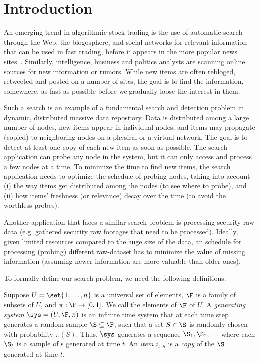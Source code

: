 \section{Introduction}\label{sec:introduction}
An emerging trend in algorithmic stock trading is the use of automatic search through the Web, the blogosphere, and social networks for relevant information that can be used in fast trading, before it appears in the more popular news sites~\cite{Delaney2009,ALPHA2014,AlphaFlash,mitra2011handbook,latar2015robot}. Similarly, intelligence, business and politics analysts are scanning online sources for new information or rumors. While new items are often rebloged, retweeted and posted on a number of sites, the goal is to find the information, somewhere, as fast as possible before we gradually loose the interest in them. %

Such a search is an example of a fundamental search and detection problem in dynamic, distributed massive data repository.  Data is distributed among a large number of nodes, new items appear in individual nodes, and items may propagate (copied) to neighboring nodes on a physical or a virtual network.  The goal is to detect at least one copy of each new item as soon as possible. The search application can probe any node in the system, but it can only access and process a few nodes at a time. 
To minimize the time to find new items, the search application needs to optimize the schedule of probing nodes, taking into account (i) the way items get distributed among the nodes (to see where to probe), and (ii) how items' freshness (or relevance) decay over the time (to avoid the worthless probes).


Another application that faces a similar search problem is processing security raw data (e.g. gathered security raw footages that need to be processed). Ideally, given limited resources compared to the huge size of the data, an schedule for processing (probing) different raw-dataset has to minimize the value of missing information (assuming newer information are more valuable than older ones).

To formally define our search problem, {\probname} we need the following definitions.

\begin{definition}
 Suppose $U=\set{1,\ldots,n}$ is a universal set of elements, $\F$ is a family of subsets of $U$, and $\pi:\F \rightarrow [0,1]$. We call the elements of $\F$ \emph{\ins} of $U$. A \emph{generating system} $\sys = (U, \F,\pi)$ is an infinite time system that at each time step generates a random sample $\S\subseteq\F$, such that a set $S\in \S$ is randomly chosen with probability $\pi(S)$. Thus, $\sys$ generates a sequence $\S_1,\S_2,\ldots$ where each $\S_t$ is a sample of {\ins}s generated at time $t$. An \emph{item} $i_{t,S}$ is a \emph{copy} of the {\ins} $\S$ generated at time $t$.
\end{definition}

